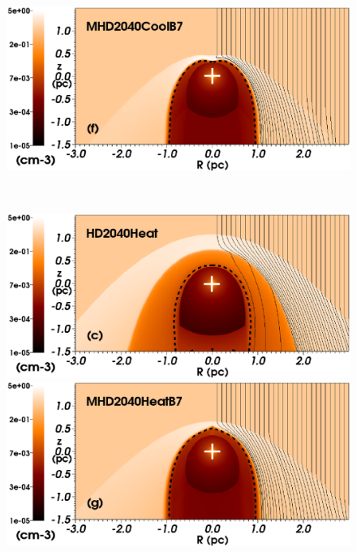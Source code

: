 \documentclass[useAMS,usenatbib]{mn2e}
\begin{document}
\begin{figure}
	\begin{minipage}[b]{ 0.48\textwidth}
		\includegraphics[width=1.0\textwidth]{./streamlines_map_20_Mo_40kms_MS_mhdcool_legend.eps}
	\end{minipage} \\
	\begin{minipage}[b]{ 0.48\textwidth}
		\includegraphics[width=1.0\textwidth]{./streamlines_map_20_Mo_40kms_MS_hdheat_legend.eps}
	\end{minipage}
	\begin{minipage}[b]{ 0.48\textwidth}
		\includegraphics[width=1.0\textwidth]{./streamlines_map_20_Mo_40kms_MS_mhdheat_legend.eps}
	\end{minipage} \\ 

\end{figure}
\end{document}
